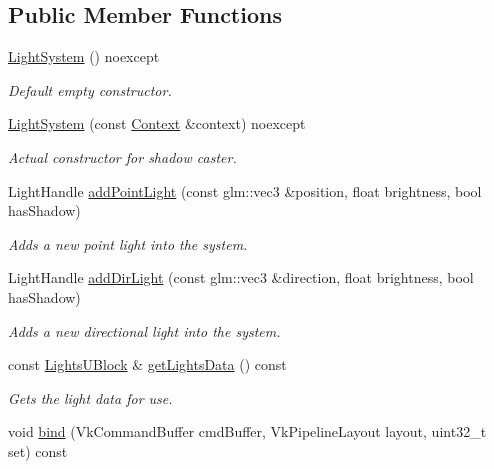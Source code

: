 \subsection*{Public Member Functions}
\begin{DoxyCompactItemize}
\item 
\mbox{\label{classblaze_1_1LightSystem_aec3e5d68a2a0dc71a7369b33d08934e7}} 
\hyperlink{classblaze_1_1LightSystem_aec3e5d68a2a0dc71a7369b33d08934e7}{Light\+System} () noexcept
\begin{DoxyCompactList}\small\item\em Default empty constructor. \end{DoxyCompactList}\item 
\hyperlink{classblaze_1_1LightSystem_a67835433d9ae788824ead52db19a2262}{Light\+System} (const \hyperlink{classblaze_1_1Context}{Context} \&context) noexcept
\begin{DoxyCompactList}\small\item\em Actual constructor for shadow caster. \end{DoxyCompactList}\item 
Light\+Handle \hyperlink{classblaze_1_1LightSystem_ac37b77db15ffe631625c12ab02e350b5}{add\+Point\+Light} (const glm\+::vec3 \&position, float brightness, bool has\+Shadow)
\begin{DoxyCompactList}\small\item\em Adds a new point light into the system. \end{DoxyCompactList}\item 
Light\+Handle \hyperlink{classblaze_1_1LightSystem_a007183000f0053c9f6c045f18e19b084}{add\+Dir\+Light} (const glm\+::vec3 \&direction, float brightness, bool has\+Shadow)
\begin{DoxyCompactList}\small\item\em Adds a new directional light into the system. \end{DoxyCompactList}\item 
const \hyperlink{structblaze_1_1LightsUBlock}{Lights\+U\+Block} \& \hyperlink{classblaze_1_1LightSystem_a82cca79795ef7aead02b6aa48b01c6e3}{get\+Lights\+Data} () const
\begin{DoxyCompactList}\small\item\em Get\textquotesingle{}s the light data for use. \end{DoxyCompactList}\item 
void \hyperlink{classblaze_1_1LightSystem_a36a06080a8c9bb0dc10adc4b82a00ab5}{bind} (Vk\+Command\+Buffer cmd\+Buffer, Vk\+Pipeline\+Layout layout, uint32\+\_\+t set) const

\end{DoxyCompactItemize}
